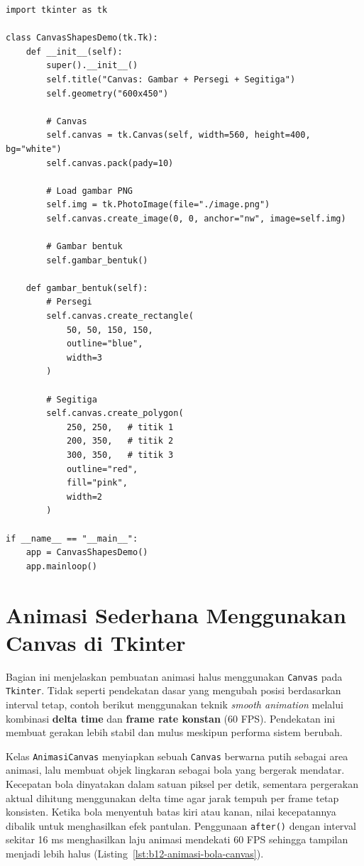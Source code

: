 \begin{lstlisting}[style=PythonStyle, caption={Menggambar persegi dan segitiga pada Canvas}, label={lst:b12-menggambar-persegi-segitiga-canvas}]
import tkinter as tk

class CanvasShapesDemo(tk.Tk):
    def __init__(self):
        super().__init__()
        self.title("Canvas: Gambar + Persegi + Segitiga")
        self.geometry("600x450")

        # Canvas
        self.canvas = tk.Canvas(self, width=560, height=400, bg="white")
        self.canvas.pack(pady=10)

        # Load gambar PNG
        self.img = tk.PhotoImage(file="./image.png")
        self.canvas.create_image(0, 0, anchor="nw", image=self.img)

        # Gambar bentuk
        self.gambar_bentuk()

    def gambar_bentuk(self):
        # Persegi
        self.canvas.create_rectangle(
            50, 50, 150, 150,
            outline="blue",
            width=3
        )

        # Segitiga
        self.canvas.create_polygon(
            250, 250,   # titik 1
            200, 350,   # titik 2
            300, 350,   # titik 3
            outline="red",
            fill="pink",
            width=2
        )

if __name__ == "__main__":
    app = CanvasShapesDemo()
    app.mainloop()
\end{lstlisting}


\section{Animasi Sederhana Menggunakan Canvas di Tkinter}

Bagian ini menjelaskan pembuatan animasi halus menggunakan \texttt{Canvas} pada \texttt{Tkinter}. Tidak seperti pendekatan dasar yang mengubah posisi berdasarkan interval tetap, contoh berikut menggunakan teknik \textit{smooth animation} melalui kombinasi \textbf{delta time} dan \textbf{frame rate konstan} (60 FPS). Pendekatan ini membuat gerakan lebih stabil dan mulus meskipun performa sistem berubah.

Kelas \texttt{AnimasiCanvas} menyiapkan sebuah \texttt{Canvas} berwarna putih sebagai area animasi, lalu membuat objek lingkaran sebagai bola yang bergerak mendatar. Kecepatan bola dinyatakan dalam satuan piksel per detik, sementara pergerakan aktual dihitung menggunakan delta time agar jarak tempuh per frame tetap konsisten. Ketika bola menyentuh batas kiri atau kanan, nilai kecepatannya dibalik untuk menghasilkan efek pantulan. Penggunaan \texttt{after()} dengan interval sekitar 16 ms menghasilkan laju animasi mendekati 60 FPS sehingga tampilan menjadi lebih halus (Listing~\ref{lst:b12-animasi-bola-canvas}).

